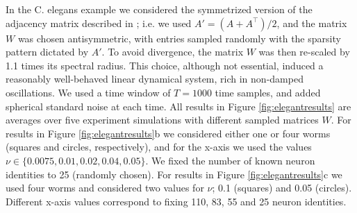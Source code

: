 In the C. elegans example we considered the symmetrized version of the
adjacency matrix described in \citep{varshney2011structural}; i.e. we
used $A'=(A+A^\top)/2$, and the matrix $W$ was chosen antisymmetric,
with entries sampled randomly with the sparsity pattern dictated by
$A'$. To avoid divergence, the matrix $W$ was then re-scaled by 1.1
times its spectral radius. This choice, although not essential,
induced a reasonably well-behaved linear dynamical system, rich in
non-damped oscillations. We used a time window of $T=1000$ time
samples, and added spherical standard noise at each time. All results
in Figure \ref{fig:elegantresults} are averages over five experiment
simulations with different sampled matrices $W$. For results in Figure
\ref{fig:elegantresults}b we considered either one or four worms
(squares and circles, respectively), and for the x-axis we used the values
$\nu \in \{0.0075,0.01,0.02,0.04,0.05\}$. We fixed the number of known neuron
identities to 25 (randomly chosen). For results in Figure
\ref{fig:elegantresults}c we used four worms and considered two values
for $\nu$; 0.1 (squares) and 0.05 (circles). Different x-axis values
correspond to fixing 110, 83, 55 and 25 neuron identities.
